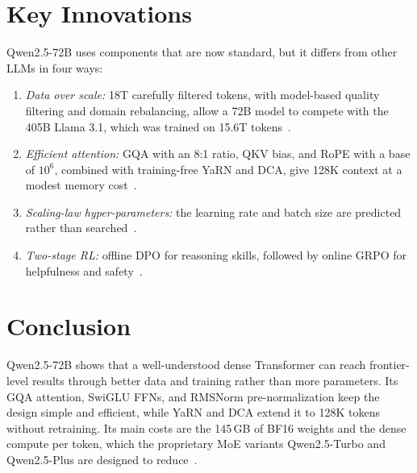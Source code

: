 \documentclass[conference]{IEEEtran}
\begin{document}
\section{Key Innovations}
Qwen2.5-72B uses components that are now standard, but it differs from other LLMs in four ways:
\begin{enumerate}
\item \emph{Data over scale:} 18T carefully filtered tokens, with model-based quality filtering and domain rebalancing, allow a 72B model to compete with the 405B Llama 3.1, which was trained on 15.6T tokens~\cite{qwen25,llama3}.
\item \emph{Efficient attention:} GQA with an 8:1 ratio, QKV bias, and RoPE with a base of $10^6$, combined with training-free YaRN and DCA, give 128K context at a modest memory cost~\cite{qwen25,qwen2}.
\item \emph{Scaling-law hyper-parameters:} the learning rate and batch size are predicted rather than searched~\cite{qwen25}.
\item \emph{Two-stage RL:} offline DPO for reasoning skills, followed by online GRPO for helpfulness and safety~\cite{qwen25}.
\end{enumerate}

\section{Conclusion}
Qwen2.5-72B shows that a well-understood dense Transformer can reach frontier-level results through better data and training rather than more parameters. Its GQA attention, SwiGLU FFNs, and RMSNorm pre-normalization keep the design simple and efficient, while YaRN and DCA extend it to 128K tokens without retraining. Its main costs are the 145\,GB of BF16 weights and the dense compute per token, which the proprietary MoE variants Qwen2.5-Turbo and Qwen2.5-Plus are designed to reduce~\cite{qwen25}.



\end{document}
